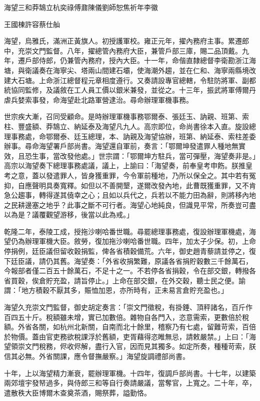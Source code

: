 
\begin{pinyinscope}
海望三和莽鵠立杭奕祿傅鼐陳儀劉師恕焦祈年李徽

王國棟許容蔡仕舢

海望，烏雅氏，滿洲正黃旗人。初授護軍校。雍正元年，擢內務府主事。累遷郎中，充崇文門監督。八年，擢總管內務府大臣，兼管戶部三庫，賜二品頂戴。九年，遷戶部侍郎，仍兼管內務府，授內大臣。十一年，命偕直隸總督李衛勘浙江海塘，與衛議奏在海寧尖、塔兩山間建石壩，使海潮外趨，並在仁和、海寧兩縣境改建大石塘。上命浙江總督程元章相度遵行。又奏請設專官總轄，令駐防將軍、副都統協同監修，及議敘在工人員工價以銀米兼發，並從之。十三年，振武將軍傅爾丹虐兵婪索事發，命海望赴北路軍營逮治。尋命辦理軍機事務。

世宗疾大漸，召同受顧命。是時辦理軍機事務鄂爾泰、張廷玉、訥親、班第、索柱、豐盛額、莽鵠立、納延泰及海望凡九人。高宗即位，命尚書徐本入直。旋設總理事務處，命鄂爾泰、廷玉總理，本、訥親及海望協辦，班第、納延泰、索柱差委辦事。尋命海望署戶部尚書。海望還自軍前，奏言：「鄂爾坤發遣罪人種地無實效，且恐生事，當改發他處。」世宗謂：「鄂爾坤方駐兵，當可彈壓，海望奏非是。」高宗以海望奏下總理事務處議，議上，上諭曰：「海望奏，前奉皇考申飭。朕推皇考之意，蓋以發遣罪人，皆身獲重罪，今令軍前種地，乃所以保全之。其中若有冤抑，自應聲明具奏寬釋。如但以不善開墾，遂爾改發內地，此曹既獲重罪，又不肯急公趨事，轉得遂其僥幸之心；且如以兵代之，兵若以不能力田為辭，則將移內地之民耕邊塞之地乎？此事之斷不可行者。海望心地純良，但識見平常，所奏豈可盡以為是？議覆觀望游移，後當以此為戒。」

乾隆二年，泰陵工成，授拖沙喇哈番世職。尋罷總理事務處，復設辦理軍機處，海望仍為辦理軍機大臣。敘勞，復加拖沙喇哈番世職。四年，加太子少保。初，上命停捐例，廷臣議但留收穀捐監，俾各省積穀備荒。六年，御史趙青藜請並停之，復下廷臣議，請仍其舊。海望奏：「外省收捐繁難，原議各省捐貯穀數三千餘萬石，今報部者僅二百五十餘萬石，不足十之一。不若停各省捐穀，令在部交銀，轉撥各省買穀，俟倉貯充盈，請旨停止。」上命在部交銀，在外交穀，聽士民之便。諭謂：「地方積穀不厭其多，賑恤加恩，亦所時有，正未易言倉貯充盈也。」

海望久充崇文門監督，御史胡定奏言：「崇文門徵稅，有掛錘、頂秤諸名，百斤作百四五十斤。稅額雖未增，實已加數倍。雜物自各門入，恣意需索，更數倍於稅額。外省各關，如杭州北新關，自南而北十餘里，稽察乃有七處，留難苛索，百倍於物價。蓋由官吏務欲稅課浮於舊額，吏胥藉得恣睢無忌，請敕嚴禁。」上曰：「海望領崇文門稅務，侭收侭解，盡行入官，因而見其獨多。如定所奏，種種苛索，朕信其必無。外省關課，應令督撫嚴察。」海望旋調禮部尚書。

十年，上以海望精力漸衰，罷辦理軍機。十四年，復調戶部尚書。十七年，以建築兩郊壇宇發帑過多，與侍郎三和等自行奏請嚴議，當奪官，上寬之。二十年，卒，遣散秩大臣博爾木查奠茶酒，賜祭葬，謚勤恪。


\end{pinyinscope}

